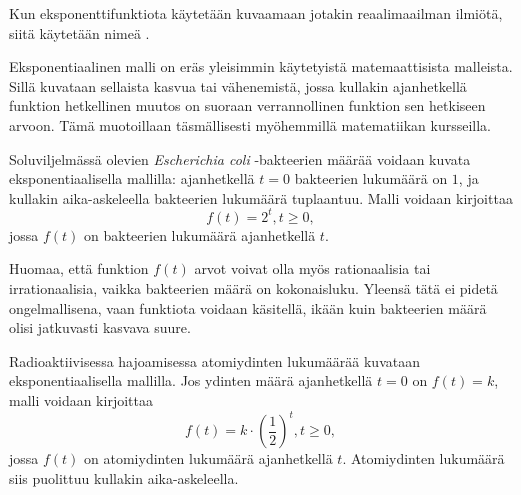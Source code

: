 Kun eksponenttifunktiota käytetään kuvaamaan jotakin reaalimaailman
ilmiötä, siitä käytetään nimeä .

Eksponentiaalinen malli on eräs yleisimmin käytetyistä matemaattisista
malleista. Sillä kuvataan sellaista kasvua tai vähenemistä, jossa
kullakin ajanhetkellä funktion hetkellinen muutos on suoraan
verrannollinen funktion sen hetkiseen arvoon. Tämä muotoillaan
täsmällisesti myöhemmillä matematiikan kursseilla.

\begin{esimerkki}
Soluviljelmässä olevien \textit{Escherichia coli} -bakteerien
määrää voidaan kuvata eksponentiaalisella mallilla: ajanhetkellä
$t = 0$ bakteerien lukumäärä on $1$, ja kullakin aika-askeleella
bakteerien lukumäärä tuplaantuu. Malli voidaan kirjoittaa
\[
f(t) = 2^t, t \ge 0,
\]
jossa $f(t)$ on bakteerien lukumäärä ajanhetkellä $t$.

Huomaa, että funktion $f(t)$ arvot voivat
olla myös rationaalisia tai irrationaalisia, vaikka bakteerien
määrä on kokonaisluku. Yleensä tätä ei pidetä ongelmallisena,
vaan funktiota voidaan käsitellä, ikään kuin bakteerien määrä
olisi jatkuvasti kasvava suure.
\end{esimerkki}

\begin{esimerkki}
Radioaktiivisessa hajoamisessa atomiydinten lukumäärää kuvataan
eksponentiaalisella mallilla. Jos ydinten määrä ajanhetkellä
$t = 0$ on $f(t) = k$, malli voidaan kirjoittaa
\[
f(t) = k \cdot \left( \frac{1}{2} \right)^t, t \ge 0,
\]
jossa $f(t)$ on atomiydinten lukumäärä ajanhetkellä $t$. Atomiydinten
lukumäärä siis puolittuu kullakin aika-askeleella.
\end{esimerkki}
